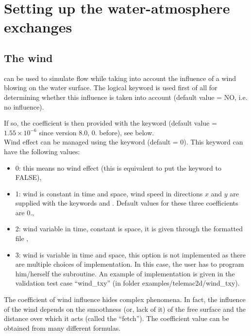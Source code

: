 \section{Setting up the water-atmosphere exchanges}

\subsection{The wind}

 can be used to simulate flow while taking into account the influence
of a wind blowing on the water surface. The logical keyword  is
used first of all for determining whether this influence is taken into account
(default value = NO, i.e. no influence).

If so, the coefficient is then provided with the keyword
 (default value =
$1.55 \times 10^{-6}$ since version 8.0, 0. before), see below.\\

Wind effect can be managed using the keyword 
(default = 0). This keyword can have the following values:

\begin{itemize}
\item 0: this means no wind effect (this is equivalent to put the keyword
 to FALSE),

\item 1: wind is constant in time and space, wind speed in directions $x$ and $y$
are supplied with the keywords  and
.
Default values for these three coefficients are 0.,

\item 2: wind variable in time, constant is space, it is given through
the formatted file ,

\item 3: wind is variable in time and space,
this option is not implemented as there are multiple choices of implementation.
In this case, the user has to program him/herself the  subroutine.
An example of implementation is given in the  validation test case
``wind\_txy'' (in folder examples/telemac2d/wind\_txy).
\end{itemize}

The coefficient of wind influence hides complex phenomena. In fact, the
influence of the wind depends on the smoothness (or, lack of it) of the free
surface and the distance over which it acts (called the ``fetch''). The
coefficient value can be obtained from many different formulas.

